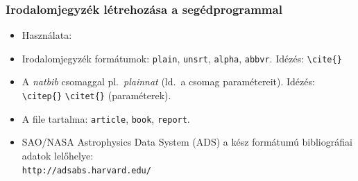 \documentclass[aspectratio=169]{beamer}
\begin{document}

\begin{frame}
\frametitle{Irodalomjegyzék létrehozása a  segédprogrammal}

\begin{itemize}
\item Használata:
\begin{verbatim*}
 

\end{verbatim*}
\item Irodalomjegyzék formátumok: \texttt{plain}, \texttt{unsrt}, \texttt{alpha}, \texttt{abbvr}. Idézés: \texttt{\textbackslash cite\{\}}
\item A \textit{natbib} csomaggal pl.~\textit{plainnat} (ld.~a csomag paramétereit). Idézés: \texttt{\textbackslash citep\{\}} \texttt{\textbackslash citet\{\}} (paraméterek).
\item A  file tartalma: \texttt{article}, \texttt{book}, \texttt{report}.
\item SAO/NASA Astrophysics Data System (ADS) a kész  formátumú bibliográfiai adatok lelőhelye:\\\texttt{http://adsabs.harvard.edu/}
\end{itemize}
\vfill
\end{frame}

\end{document}
